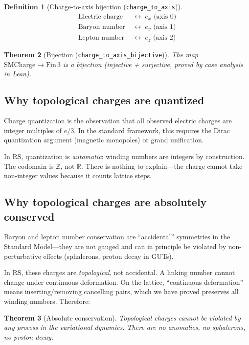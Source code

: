 \documentclass[11pt,a4paper]{article}
\theoremstyle{plain}
\newtheorem{theorem}{Theorem}[section]
\theoremstyle{definition}
\newtheorem{definition}[theorem]{Definition}
\theoremstyle{remark}
\newcommand{\R}{\mathbb{R}}
\newcommand{\Z}{\mathbb{Z}}
\begin{document}
\begin{definition}[Charge-to-axis bijection {\normalfont(\texttt{charge\_to\_axis})}]
\begin{align*}
\text{Electric charge} &\;\leftrightarrow\; e_x \text{ (axis 0)} \\
\text{Baryon number} &\;\leftrightarrow\; e_y \text{ (axis 1)} \\
\text{Lepton number} &\;\leftrightarrow\; e_z \text{ (axis 2)}
\end{align*}
\end{definition}

\begin{theorem}[Bijection {\normalfont(\texttt{charge\_to\_axis\_bijective})}]
The map $\text{SMCharge} \to \text{Fin}\,3$ is a bijection
(injective + surjective, proved by case analysis in Lean).
\end{theorem}

\subsection{Why topological charges are quantized}

Charge quantization is the observation that all observed electric
charges are integer multiples of $e/3$.  In the standard framework,
this requires the Dirac quantization argument (magnetic monopoles)
or grand unification.

In RS, quantization is \emph{automatic}: winding numbers are integers
by construction.  The codomain is $\Z$, not $\R$.  There is nothing
to explain---the charge cannot take non-integer values because it counts
lattice steps.

\subsection{Why topological charges are absolutely conserved}

Baryon and lepton number conservation are ``accidental'' symmetries
in the Standard Model---they are not gauged and can in principle be
violated by non-perturbative effects (sphalerons, proton decay in GUTs).

In RS, these charges are \emph{topological}, not accidental.  A linking
number cannot change under continuous deformation.  On the lattice,
``continuous deformation'' means inserting/removing cancelling pairs,
which we have proved preserves all winding numbers.  Therefore:

\begin{theorem}[Absolute conservation]
Topological charges cannot be violated by any process in the variational
dynamics.  There are no anomalies, no sphalerons, no proton decay.
\end{theorem}
\end{document}
